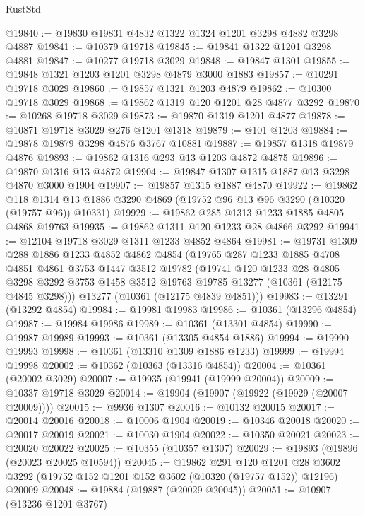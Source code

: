 \begin{lexlean}{RustStd}
\begin{coremodule}
@19840 := @19830 @19831 @4832 @1322 @1324 @1201 @3298 @4882 @3298 @4887
@19841 := @10379 @19718
@19845 := @19841 @1322 @1201 @3298 @4881
@19847 := @10277 @19718 @3029
@19848 := @19847 @1301
@19855 := @19848 @1321 @1203 @1201 @3298 @4879 @3000 @1883
@19857 := @10291 @19718 @3029
@19860 := @19857 @1321 @1203 @4879
@19862 := @10300 @19718 @3029
@19868 := @19862 @1319 @120 @1201 @28 @4877 @3292
@19870 := @10268 @19718 @3029
@19873 := @19870 @1319 @1201 @4877
@19878 := @10871 @19718 @3029 @276 @1201 @1318
@19879 := @101 @1203
@19884 := @19878 @19879 @3298 @4876 @3767 @10881
@19887 := @19857 @1318 @19879 @4876
@19893 := @19862 @1316 @293 @13 @1203 @4872 @4875
@19896 := @19870 @1316 @13 @4872
@19904 := @19847 @1307 @1315 @1887 @13 @3298 @4870 @3000 @1904
@19907 := @19857 @1315 @1887 @4870
@19922 := @19862
    @118
    @1314
    @13
    @1886
    @3290
    @4869
    (@19752 @96 @13 @96 @3290 (@10320 (@19757 @96)) @10331)
@19929 := @19862 @285 @1313 @1233 @1885 @4805 @4868 @19763
@19935 := @19862 @1311 @120 @1233 @28 @4866 @3292
@19941 := @12104 @19718 @3029 @1311 @1233 @4852 @4864
@19981 := @19731
    @1309
    @288
    @1886
    @1233
    @4852
    @4862
    @4854
    (@19765
      @287
      @1233
      @1885
      @4708
      @4851
      @4861
      @3753
      @1447
      @3512
      @19782
      (@19741
        @120
        @1233
        @28
        @4805
        @3298
        @3292
        @3753
        @1458
        @3512
        @19763
        @19785
        @13277
        (@10361 (@12175 @4845 @3298)))
      @13277
      (@10361 (@12175 @4839 @4851)))
@19983 := @13291 (@13292 @4854)
@19984 := @19981 @19983
@19986 := @10361 (@13296 @4854)
@19987 := @19984 @19986
@19989 := @10361 (@13301 @4854)
@19990 := @19987 @19989
@19993 := @10361 (@13305 @4854 @1886)
@19994 := @19990 @19993
@19998 := @10361 (@13310 @1309 @1886 @1233)
@19999 := @19994 @19998
@20002 := @10362 (@10363 (@13316 @4854))
@20004 := @10361 (@20002 @3029)
@20007 := @19935 (@19941 (@19999 @20004))
@20009 := @10337 @19718 @3029
@20014 := @19904 (@19907 (@19922 (@19929 (@20007 @20009))))
@20015 := @9936 @1307
@20016 := @10132 @20015
@20017 := @20014 @20016
@20018 := @10006 @1904
@20019 := @10346 @20018
@20020 := @20017 @20019
@20021 := @10030 @1904
@20022 := @10350 @20021
@20023 := @20020 @20022
@20025 := @10355 (@10357 @1307)
@20029 := @19893 (@19896 (@20023 @20025 @10594))
@20045 := @19862
    @291
    @120
    @1201
    @28
    @3602
    @3292
    (@19752 @152 @1201 @152 @3602 (@10320 (@19757 @152)) @12196)
    @20009
@20048 := @19884 (@19887 (@20029 @20045))
@20051 := @10907 (@13236 @1201 @3767)

\end{coremodule}
\end{lexlean}
